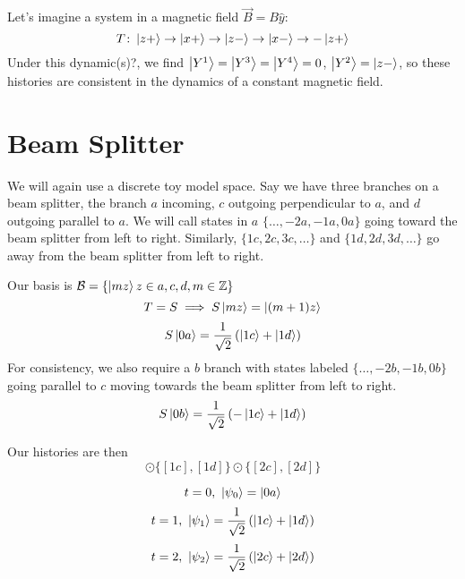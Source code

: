 \documentclass[a4paper,twoside,master.tex]{subfiles}
\begin{document}
Let's imagine a system in a magnetic field $\vec{B} = B \hat{y}$:
\begin{equation}
    T\colon\ket{z+}\to\ket{x+}\to\ket{z-}\to\ket{x-}\to -\ket{z+}
\end{equation}
Under this dynamic(s)?, we find $\ket{Y^1}=\ket{Y^3}=\ket{Y^4} = 0$, $\ket{Y^2} = \ket{z-}$, so these histories are consistent in the dynamics of a constant magnetic field.

\section{Beam Splitter}%
\label{sec:beam_splitte}

We will again use a discrete toy model space. Say we have three branches on a beam splitter, the branch $a$ incoming, $c$ outgoing perpendicular to $a$, and $d$ outgoing parallel to $a$. We will call states in $a$ $\{\ldots, -2a,-1a,0a\}$ going toward the beam splitter from left to right. Similarly, $\{1c,2c,3c, \ldots\}$ and $\{1d,2d,3d, \ldots\} $ go away from the beam splitter from left to right.

Our basis is $\mathcal{B} = \{\ket{mz} z\in a, c,d,m\in\mathbb{Z}\} $
\begin{equation}
    T= S\implies S\ket{mz} = \ket{(m+1)z}
\end{equation}
\begin{equation}
    S\ket{0a} = \frac{1}{\sqrt{2} }\left( \ket{1c} + \ket{1d} \right) 
\end{equation}
For consistency, we also require a $b$ branch with states labeled $\{\ldots,-2b,-1b,0b\} $ going parallel to $c$ moving towards the beam splitter from left to right.
\begin{equation}
    S\ket{0b} = \frac{1}{\sqrt{2} }\left( -\ket{1c} + \ket{1d} \right) 
\end{equation}

Our histories are then
\begin{equation}
    [0a]\odot \{[1c],[1d]\}\odot \{[2c],[2d]\} 
\end{equation}

\begin{equation}
    t=0,\ \ket{\psi_0} = \ket{0a}
\end{equation}
\begin{equation}
    t = 1,\ \ket{\psi_1} = \frac{1}{\sqrt{2} }\left( \ket{1c}+\ket{1d} \right) 
\end{equation}
\begin{equation}
    t=2,\ \ket{\psi_2} = \frac{1}{\sqrt{2} }\left( \ket{2c}+\ket{2d} \right) 
\end{equation}
\end{document}
